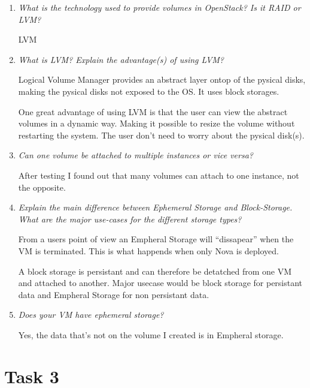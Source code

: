 \documentclass[a4paper]{article}
\begin{document}
\begin{enumerate}
    \item \textit{What is the technology used to provide volumes in OpenStack? Is it RAID or LVM?}
    
    LVM
    \item \textit{What is LVM? Explain the advantage(s) of using LVM?}
    
    Logical Volume Manager provides an abstract layer ontop of the pysical disks, making the pysical disks not exposed to the OS. It uses block storages.
    
    One great advantage of using LVM is that the user can view the abstract volumes in a dynamic way. Making it possible to resize the volume without restarting the system. The user don't need to worry about the pysical disk(s). 
    \item \textit{Can one volume be attached to multiple instances or vice versa?}
    
    After testing I found out that many volumes can attach to one instance, not the opposite.
    \item \textit{Explain the main difference between Ephemeral Storage and Block-Storage. What are the major use-cases for the different storage types?}
    
    From a users point of view an Empheral Storage will ``dissapear'' when the VM is terminated. This is what happends when only Nova is deployed.
    
    A block storage is persistant and can therefore be detatched from one VM and attached to another. 
    Major usecase would be block storage for persistant data and Empheral Storage for non persistant data.
    \item \textit{Does your VM have ephemeral storage?}
    
    Yes, the data that's not on the volume I created is in Empheral storage.
\end{enumerate}

\section*{Task 3}
\end{document}
